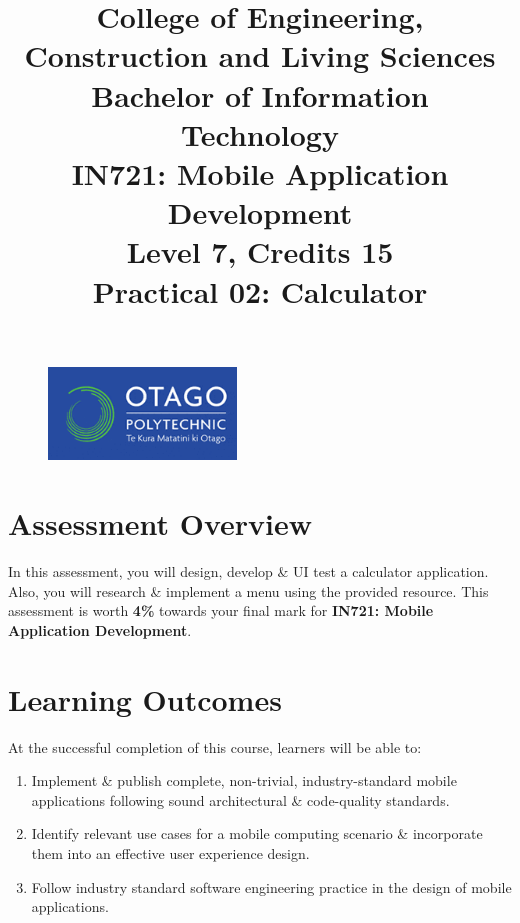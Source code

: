 \documentclass{article}
\author{}
\begin{document}
\begin{figure}
	\centering
	\includegraphics[width=50mm]{./img/logo.png}
\end{figure}

\title{College of Engineering, Construction and Living Sciences\\Bachelor of Information Technology\\IN721: Mobile Application Development\\Level 7, Credits 15\\\textbf{Practical 02: Calculator}}
\date{}
\maketitle

\section*{Assessment Overview}
In this assessment, you will design, develop \& UI test a calculator application. Also, you will research \& implement a menu using the provided resource. This assessment is worth \textbf{4\%} towards your final mark for \textbf{IN721: Mobile Application Development}.

\section*{Learning Outcomes}
At the successful completion of this course, learners will be able to:
\begin{enumerate}
	\item Implement \& publish complete, non-trivial, industry-standard mobile applications following sound architectural \& code-quality standards.
	\item Identify relevant use cases for a mobile computing scenario \& incorporate them into an effective user experience design.
	\item Follow industry standard software engineering practice in the design of mobile applications.
\end{enumerate}
\end{document}
